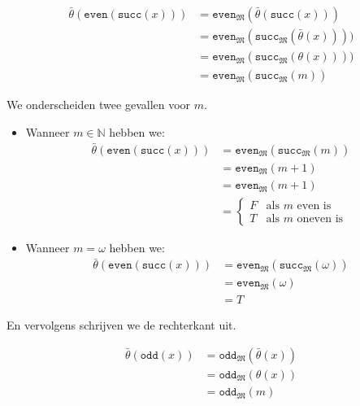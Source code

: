 \documentclass[a4paper,11pt]{article}
\begin{document}
\begin{itemize}
\begin{align*}
\bar \theta(\texttt{even}(\texttt{succ}(x))) &= \texttt{even}_{\mathfrak{M}}(\bar \theta(\texttt{succ}(x))) \\
                                             &= \texttt{even}_{\mathfrak{M}}(\texttt{succ}_{\mathfrak{M}}(\bar \theta(x)))) \\
                                             &= \texttt{even}_{\mathfrak{M}}(\texttt{succ}_{\mathfrak{M}}(\theta(x)))) \\
                                             &= \texttt{even}_{\mathfrak{M}}(\texttt{succ}_{\mathfrak{M}}(m))
\end{align*}

We onderscheiden twee gevallen voor $m$.

\begin{itemize}

\item
Wanneer $m \in \mathbb{N}$ hebben we:
\begin{align*}
\bar \theta(\texttt{even}(\texttt{succ}(x))) &= \texttt{even}_{\mathfrak{M}}(\texttt{succ}_{\mathfrak{M}}(m)) \\
                                             &= \texttt{even}_{\mathfrak{M}}(m+1) \\
                                             &= \texttt{even}_{\mathfrak{M}}(m+1) \\
                                             &= \begin{cases}
  F & \text{als $m$ even is} \\
  T & \text{als $m$ oneven is}
\end{cases}
\end{align*}

\item
Wanneer $m = \omega$ hebben we:
\begin{align*}
\bar \theta(\texttt{even}(\texttt{succ}(x))) &= \texttt{even}_{\mathfrak{M}}(\texttt{succ}_{\mathfrak{M}}(\omega)) \\
                                             &= \texttt{even}_{\mathfrak{M}}(\omega) \\
                                             &= T
\end{align*}

\end{itemize}

En vervolgens schrijven we de rechterkant uit.

\begin{align*}
\bar \theta(\texttt{odd}(x)) &= \texttt{odd}_{\mathfrak{M}}(\bar \theta(x)) \\
                             &= \texttt{odd}_{\mathfrak{M}}(\theta(x)) \\
                             &= \texttt{odd}_{\mathfrak{M}}(m)
\end{align*}


\end{itemize}
\end{document}

